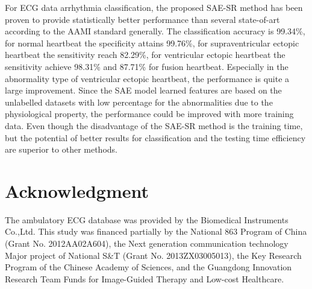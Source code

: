 \documentclass{bmcart}
\begin{document}
For ECG data arrhythmia classification, the proposed SAE-SR method has been proven to provide statistically better performance than several state-of-art according to the AAMI standard generally. The classification accuracy is 99.34\%, for normal heartbeat the specificity attains 99.76\%, for supraventricular ectopic heartbeat the sensitivity reach 82.29\%, for ventricular ectopic heartbeat the sensitivity achieve 98.31\% and 87.71\% for fusion heartbeat. Especially in the abnormality type of ventricular ectopic heartbeat, the performance is quite a large improvement. Since the SAE model learned features are based on the unlabelled datasets with low percentage for the abnormalities due to the physiological property, the performance could be improved with more training data. Even though the disadvantage of the SAE-SR method is the training time, but the potential of better results for classification and the testing time efficiency are superior to other methods. 


\section*{Acknowledgment}
The ambulatory ECG database was provided by the Biomedical Instruments Co.,Ltd.
This study was financed partially by the National 863 Program of China (Grant No. 2012AA02A604), the Next generation communication technology Major project of National S\&T (Grant No. 2013ZX03005013), the Key Research Program of the Chinese Academy of Sciences, and the Guangdong Innovation Research Team Funds for Image-Guided Therapy and Low-cost Healthcare. 



\end{document}
